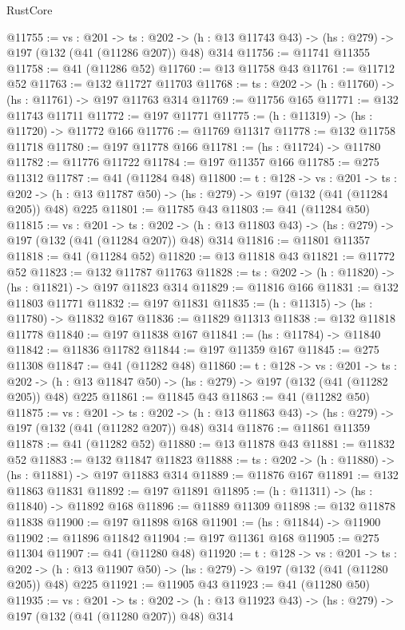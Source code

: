 \begin{lexlean}{RustCore}
\begin{coremodule}
@11755 := {vs : @201} ->
  {ts : @202} -> (h : @13 @11743 @43) -> (hs : @279) -> @197 (@132 (@41 (@11286 @207)) @48) @314
@11756 := @11741 @11355
@11758 := @41 (@11286 @52)
@11760 := @13 @11758 @43
@11761 := @11712 @52
@11763 := @132 @11727 @11703
@11768 := {ts : @202} -> (h : @11760) -> (hs : @11761) -> @197 @11763 @314
@11769 := @11756 @165
@11771 := @132 @11743 @11711
@11772 := @197 @11771
@11775 := (h : @11319) -> (hs : @11720) -> @11772 @166
@11776 := @11769 @11317
@11778 := @132 @11758 @11718
@11780 := @197 @11778 @166
@11781 := (hs : @11724) -> @11780
@11782 := @11776 @11722
@11784 := @197 @11357 @166
@11785 := @275 @11312
@11787 := @41 (@11284 @48)
@11800 := {t : @128} ->
  {vs : @201} ->
  {ts : @202} -> (h : @13 @11787 @50) -> (hs : @279) -> @197 (@132 (@41 (@11284 @205)) @48) @225
@11801 := @11785 @43
@11803 := @41 (@11284 @50)
@11815 := {vs : @201} ->
  {ts : @202} -> (h : @13 @11803 @43) -> (hs : @279) -> @197 (@132 (@41 (@11284 @207)) @48) @314
@11816 := @11801 @11357
@11818 := @41 (@11284 @52)
@11820 := @13 @11818 @43
@11821 := @11772 @52
@11823 := @132 @11787 @11763
@11828 := {ts : @202} -> (h : @11820) -> (hs : @11821) -> @197 @11823 @314
@11829 := @11816 @166
@11831 := @132 @11803 @11771
@11832 := @197 @11831
@11835 := (h : @11315) -> (hs : @11780) -> @11832 @167
@11836 := @11829 @11313
@11838 := @132 @11818 @11778
@11840 := @197 @11838 @167
@11841 := (hs : @11784) -> @11840
@11842 := @11836 @11782
@11844 := @197 @11359 @167
@11845 := @275 @11308
@11847 := @41 (@11282 @48)
@11860 := {t : @128} ->
  {vs : @201} ->
  {ts : @202} -> (h : @13 @11847 @50) -> (hs : @279) -> @197 (@132 (@41 (@11282 @205)) @48) @225
@11861 := @11845 @43
@11863 := @41 (@11282 @50)
@11875 := {vs : @201} ->
  {ts : @202} -> (h : @13 @11863 @43) -> (hs : @279) -> @197 (@132 (@41 (@11282 @207)) @48) @314
@11876 := @11861 @11359
@11878 := @41 (@11282 @52)
@11880 := @13 @11878 @43
@11881 := @11832 @52
@11883 := @132 @11847 @11823
@11888 := {ts : @202} -> (h : @11880) -> (hs : @11881) -> @197 @11883 @314
@11889 := @11876 @167
@11891 := @132 @11863 @11831
@11892 := @197 @11891
@11895 := (h : @11311) -> (hs : @11840) -> @11892 @168
@11896 := @11889 @11309
@11898 := @132 @11878 @11838
@11900 := @197 @11898 @168
@11901 := (hs : @11844) -> @11900
@11902 := @11896 @11842
@11904 := @197 @11361 @168
@11905 := @275 @11304
@11907 := @41 (@11280 @48)
@11920 := {t : @128} ->
  {vs : @201} ->
  {ts : @202} -> (h : @13 @11907 @50) -> (hs : @279) -> @197 (@132 (@41 (@11280 @205)) @48) @225
@11921 := @11905 @43
@11923 := @41 (@11280 @50)
@11935 := {vs : @201} ->
  {ts : @202} -> (h : @13 @11923 @43) -> (hs : @279) -> @197 (@132 (@41 (@11280 @207)) @48) @314

\end{coremodule}
\end{lexlean}
